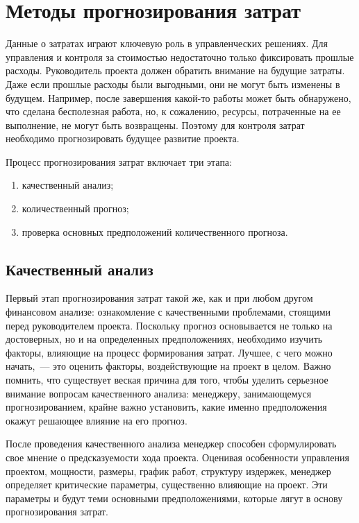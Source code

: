 \chapter{Методы прогнозирования затрат}

Данные о затратах играют ключевую роль в управленческих решениях. Для управления и контроля за стоимостью недостаточно только фиксировать прошлые расходы. 
Руководитель проекта должен обратить внимание на будущие затраты. 
Даже если прошлые расходы были выгодными, они не могут быть изменены в будущем. 
Например, после завершения какой-то работы может быть обнаружено, что сделана бесполезная работа, но, к сожалению, ресурсы, потраченные на ее выполнение, не могут быть возвращены. 
Поэтому для контроля затрат необходимо прогнозировать будущее развитие проекта.

Процесс прогнозирования затрат включает три этапа:
\begin{enumerate}
	\item качественный анализ;
	\item количественный прогноз;
	\item проверка основных предположений количественного прогноза.
\end{enumerate}

\section{Качественный анализ}

Первый этап прогнозирования затрат такой же, как и при любом другом финансовом анализе: ознакомление с качественными проблемами, стоящими перед руководителем проекта. 
Поскольку прогноз основывается не только на достоверных, но и на определенных предположениях, необходимо изучить факторы, влияющие на процесс формирования затрат. 
Лучшее, с чего можно начать,~--- это оценить факторы, воздействующие на проект в целом. 
Важно помнить, что существует веская причина для того, чтобы уделить серьезное внимание вопросам качественного анализа: менеджеру, занимающемуся прогнозированием, крайне важно установить, какие именно предположения окажут решающее влияние на его прогноз.

После проведения качественного анализа менеджер способен сформулировать свое мнение о предсказуемости хода проекта. Оценивая особенности управления проектом, мощности, размеры, график работ, структуру издержек, менеджер определяет критические параметры, существенно влияющие на проект. 
Эти параметры и будут теми основными предположениями, которые лягут в основу прогнозирования затрат.

